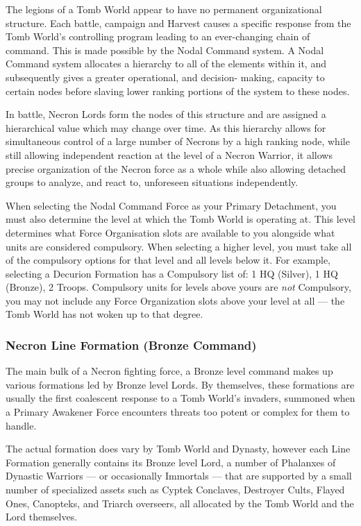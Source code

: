 The legions of a Tomb World appear to have no permanent organizational structure. Each battle, campaign and Harvest causes a specific response from the Tomb World's controlling program leading to an ever-changing chain of command. This is made possible by the Nodal Command system. A Nodal Command system allocates a hierarchy to all of the elements within it, and subsequently gives a greater operational, and decision- making, capacity to certain nodes before slaving lower ranking portions of the system to these nodes.

In battle, Necron Lords form the nodes of this structure and are assigned a hierarchical value which may change over time. As this hierarchy allows for simultaneous control of a large number of Necrons by a high ranking node, while still allowing independent reaction at the level of a Necron Warrior, it allows precise organization of the Necron force as a whole while also allowing detached groups to analyze, and react to, unforeseen situations independently.

When selecting the Nodal Command Force as your Primary Detachment, you must also determine the level at which the Tomb World is operating at. This level determines what Force Organisation slots are available to you alongside what units are considered compulsory. When selecting a higher level, you must take all of the compulsory options for that level and all levels below it. For example, selecting a Decurion Formation has a Compulsory list of: 1 HQ (Silver), 1 HQ (Bronze), 2 Troops. Compulsory units for levels above yours are \textit{not} Compulsory, you may not include any Force Organization slots above your level at all — the Tomb World has not woken up to that degree.

\subsubsection{Necron Line Formation (Bronze Command)}

The main bulk of a Necron fighting force, a Bronze level command makes up various formations led by Bronze level Lords. By themselves, these formations are usually the first coalescent response to a Tomb World's invaders, summoned when a Primary Awakener Force encounters threats too potent or complex for them to handle. 

The actual formation does vary by Tomb World and Dynasty, however each Line Formation generally contains its Bronze level Lord, a number of Phalanxes of Dynastic Warriors — or occasionally Immortals — that are supported by a small number of specialized assets such as Cyptek Conclaves, Destroyer Cults, Flayed Ones, Canopteks, and Triarch overseers, all allocated by the Tomb World and the Lord themselves.

